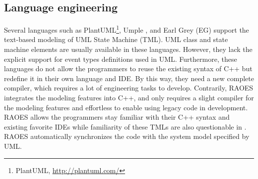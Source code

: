 \subsection{Language engineering}
Several languages such as PlantUML\footnote{PlantUML, \url{http://plantuml.com/}}, Umple \cite{lethbridge2010umplification}, and Earl Grey (EG) \cite{mazanec2012general} support the text-based modeling of UML State Machine (TML).  
UML class and state machine elements are usually available in these languages.
However, they lack the explicit support for event types definitions used in UML.
Furthermore, these languages 
do not allow the programmers to reuse the existing syntax of C++ but redefine it in their own language and IDE. 
By this way, they need a new complete compiler, which requires a lot of engineering tasks to develop. 
Contrarily, RAOES integrates the modeling features into C++, and only requires a slight compiler for the modeling features and effortless to enable using legacy code in development.
RAOES allows the programmers stay familiar with their C++ syntax and existing favorite IDEs while familiarity of these TMLs are also questionable in \cite{mazanec2012general}. 
RAOES automatically synchronizes the code with the system model specified by UML.

\begin{comment}
\begin{itemize}[\footnotesize]
	\item RAOES adapts USM features to existing programming languages while Umple or TextUML does inversely, hence RAOES profits all benefices of IDEs such as intelligent completion and easy to implement. Furthermore, RAOES allows to use all specific C++ features such as function pointers for program efficiency, which are not available in the the TMLs.
	
	\item In RAOES, the programmers write and maintain the USM-based behavior part in the same class/file containing the active class.
	
	\item RAOES support full USM features.
	
	\item RAOES automatically synchronizes the code with the system model specified by UML.
	
	\item RAOES defines the state machine topology separately from the transition table and event definition.
\end{itemize}
\end{comment}


